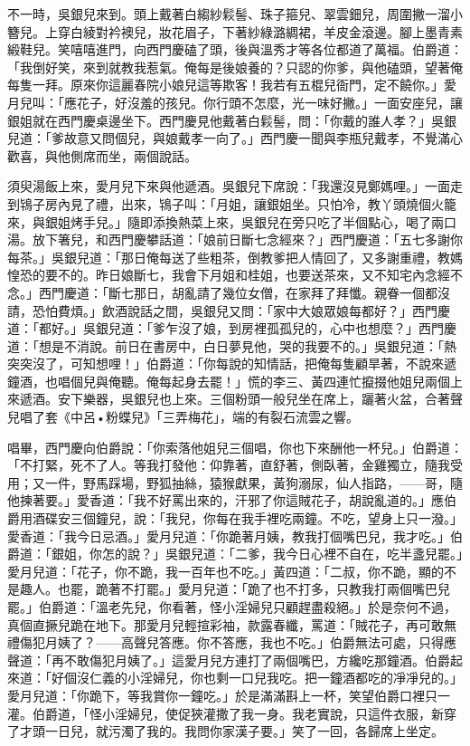 不一時，吳銀兒來到。頭上戴著白縐紗鬏髻、珠子箍兒、翠雲鈿兒，周圍撇一溜小簪兒。上穿白綾對衿襖兒，妝花眉子，下著紗綠潞綢裙，羊皮金滾邊。腳上墨青素緞鞋兒。笑嘻嘻進門，向西門慶磕了頭，後與溫秀才等各位都道了萬福。伯爵道：「我倒好笑，來到就教我惹氣。俺每是後娘養的？只認的你爹，與他磕頭，望著俺每隻一拜。原來你這麗春院小娘兒這等欺客！我若有五棍兒衙門，定不饒你。」愛月兒叫：「應花子，好沒羞的孩兒。你行頭不怎麼，光一味好撇。」一面安座兒，讓銀姐就在西門慶桌邊坐下。西門慶見他戴著白鬏髻，問：「你戴的誰人孝？」吳銀兒道：「爹故意又問個兒，與娘戴孝一向了。」西門慶一聞與李瓶兒戴孝，不覺滿心歡喜，與他側席而坐，兩個說話。

須臾湯飯上來，愛月兒下來與他遞酒。吳銀兒下席說：「我還沒見鄭媽哩。」一面走到鴇子房內見了禮，出來，鴇子叫：「月姐，讓銀姐坐。只怕冷，教丫頭燒個火籠來，與銀姐烤手兒。」隨即添換熱菜上來，吳銀兒在旁只吃了半個點心，喝了兩口湯。放下箸兒，和西門慶攀話道：「娘前日斷七念經來？」西門慶道：「五七多謝你每茶。」吳銀兒道：「那日俺每送了些粗茶，倒教爹把人情回了，又多謝重禮，教媽惶恐的要不的。昨日娘斷七，我會下月姐和桂姐，也要送茶來，又不知宅內念經不念。」西門慶道：「斷七那日，胡亂請了幾位女僧，在家拜了拜懺。親眷一個都沒請，恐怕費煩。」飲酒說話之間，吳銀兒又問：「家中大娘眾娘每都好？」西門慶道：「都好。」吳銀兒道：「爹乍沒了娘，到房裡孤孤兒的，心中也想麼？」西門慶道：「想是不消說。前日在書房中，白日夢見他，哭的我要不的。」吳銀兒道：「熱突突沒了，可知想哩！」伯爵道：「你每說的知情話，把俺每隻顧旱著，不說來遞鐘酒，也唱個兒與俺聽。俺每起身去罷！」慌的李三、黃四連忙攛掇他姐兒兩個上來遞酒。安下樂器，吳銀兒也上來。三個粉頭一般兒坐在席上，躧著火盆，合著聲兒唱了套《中呂•粉蝶兒》「三弄梅花」，端的有裂石流雲之響。

唱畢，西門慶向伯爵說：「你索落他姐兒三個唱，你也下來酬他一杯兒。」伯爵道：「不打緊，死不了人。等我打發他：仰靠著，直舒著，側臥著，金雞獨立，隨我受用；又一件，野馬踩場，野狐抽絲，猿猴獻果，黃狗溺尿，仙人指路，——哥，隨他揀著要。」愛香道：「我不好罵出來的，汗邪了你這賊花子，胡說亂道的。」應伯爵用酒碟安三個鐘兒，說：「我兒，你每在我手裡吃兩鐘。不吃，望身上只一潑。」愛香道：「我今日忌酒。」愛月兒道：「你跪著月姨，教我打個嘴巴兒，我才吃。」伯爵道：「銀姐，你怎的說？」吳銀兒道：「二爹，我今日心裡不自在，吃半盞兒罷。」愛月兒道：「花子，你不跪，我一百年也不吃。」黃四道：「二叔，你不跪，顯的不是趣人。也罷，跪著不打罷。」愛月兒道：「跪了也不打多，只教我打兩個嘴巴兒罷。」伯爵道：「溫老先兒，你看著，怪小淫婦兒只顧趕盡殺絕。」於是奈何不過，真個直撅兒跪在地下。那愛月兒輕揎彩袖，款露春纖，罵道：「賊花子，再可敢無禮傷犯月姨了？——高聲兒答應。你不答應，我也不吃。」伯爵無法可處，只得應聲道：「再不敢傷犯月姨了。」這愛月兒方連打了兩個嘴巴，方纔吃那鐘酒。伯爵起來道：「好個沒仁義的小淫婦兒，你也剩一口兒我吃。把一鐘酒都吃的凈凈兒的。」愛月兒道：「你跪下，等我賞你一鐘吃。」於是滿滿斟上一杯，笑望伯爵口裡只一灌。伯爵道，「怪小淫婦兒，使促狹灌撒了我一身。我老實說，只這件衣服，新穿了才頭一日兒，就污濁了我的。我問你家漢子要。」笑了一回，各歸席上坐定。

